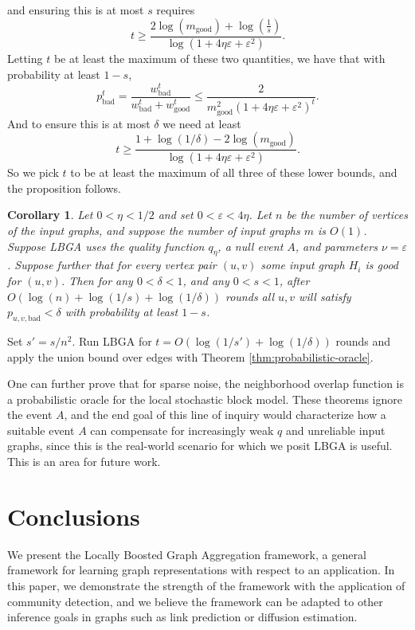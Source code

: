 \documentclass{IEEEtran}
\newtheorem{cor}{Corollary}
\begin{document}
\begin{IEEEproof}
$$$$
and ensuring this is at most $s$ requires
$$
    t \geq \frac{2\log(m_{\text{good}}) + \log \left ( \frac{1}{s} \right
)}{\log \left ( 1 + 4 \eta \varepsilon + \varepsilon^2 \right )}.
$$
Letting $t$ be at least the maximum of these two quantities, we have that with probability at least $1-s$,
$$
    p_{\text{bad}}^t = \frac{w_{\text{bad}}^t}{w_{\text{bad}}^t +
w_{\text{good}}^t} \leq \frac{2}{m_{\text{good}}^2 (1 + 4\eta \varepsilon +
\varepsilon^2)^t}.
$$
And to ensure this is at most $\delta$ we need at least
$$
    t \geq \frac{1 + \log(1/\delta) - 2 \log(m_{\text{good}})}{\log(1 + 4\eta
\varepsilon + \varepsilon^2)}.
$$
So we pick $t$ to be at least the maximum of all three of these lower bounds,
and the proposition follows.
\end{IEEEproof}

\begin{cor}
\label{cor:probabilistic-cor}
Let $0 < \eta < 1/2$ and set $0 < \varepsilon < 4\eta$. Let $n$ be the number
of vertices of the input graphs, and suppose the number of input graphs $m$ is
$O(1)$. Suppose LBGA uses the quality function $q_\eta$, a null event $A$, and
parameters $\nu = \varepsilon$. Suppose further that for every vertex pair
$(u,v)$ some input graph $H_i$ is good for $(u,v)$.  Then for any $0 < \delta <
1$, and any $0 < s < 1$, after $O(\log(n) + \log(1/s) + \log(1/\delta))$ rounds
all $u,v$ will satisfy $p_{u,v, \text{bad}} < \delta$ with probability at least
$1-s$.
\end{cor}

\begin{IEEEproof}
Set $s' = s/n^2$. Run LBGA for $t = O(\log(1/s') + \log(1/\delta))$ rounds and
apply the union bound over edges with Theorem \ref{thm:probabilistic-oracle}.
\end{IEEEproof}

One can further prove that for sparse noise, the neighborhood overlap function
is a probabilistic oracle for the local stochastic block model. These theorems
ignore the event $A$, and the end goal of this line of inquiry would
characterize how a suitable event $A$ can compensate for increasingly weak $q$
and unreliable input graphs, since this is the real-world scenario for which we
posit LBGA is useful. This is an area for future work.

\section{Conclusions}
\label{sec:conclusion}
We present the Locally Boosted Graph Aggregation framework, a general framework
for learning graph representations with respect to an application. In this
paper, we demonstrate the strength of the framework with the application of
community detection, and we believe the framework can be adapted to other
inference goals in graphs such as link prediction or diffusion estimation. 
\end{document}
